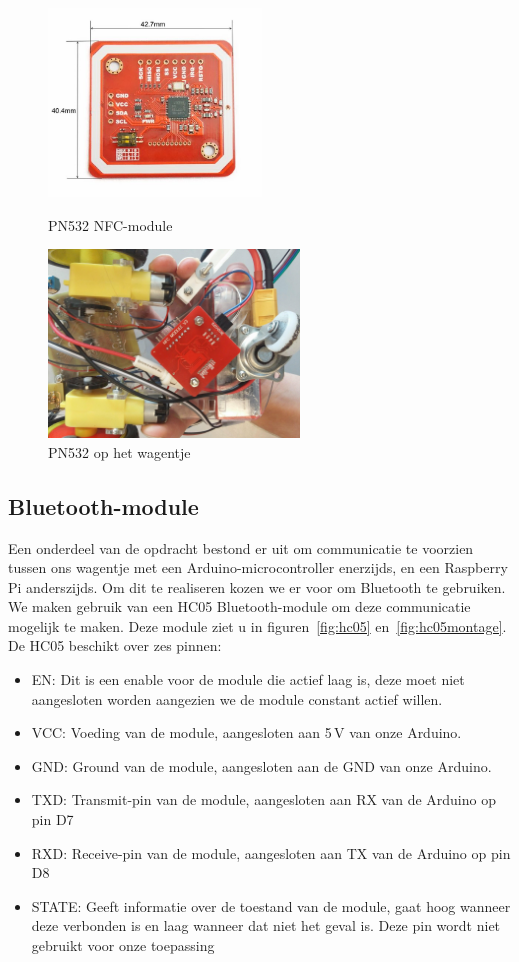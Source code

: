 \begin{figure}[H]
	\centering
	\begin{minipage}[b]{0.4\textwidth}
		\centering
		\includegraphics[height=5cm]{rfidlezer.png}
		\caption{PN532 NFC-module\label{fig:pn532}}
	\end{minipage}
	\hfill
	\begin{minipage}[b]{0.4\textwidth}
		\centering
		\includegraphics[height=5cm]{rfidlezermontage.png}
		\caption{PN532 op het wagentje\label{fig:rfidlezermontage}}
	\end{minipage}
\end{figure}
\subsection{Bluetooth-module}
Een onderdeel van de opdracht bestond er uit om communicatie te voorzien tussen ons wagentje met een Arduino-microcontroller enerzijds, en een Raspberry Pi anderszijds. Om dit te realiseren kozen we er voor om Bluetooth te gebruiken.
We maken gebruik van een HC05 Bluetooth-module om deze communicatie mogelijk te maken.
Deze module ziet u in figuren~\ref{fig:hc05} en~\ref{fig:hc05montage}. De HC05 beschikt over zes pinnen:
\begin{itemize}
	\item EN: Dit is een enable voor de module die actief laag is, deze moet niet aangesloten worden aangezien we de module constant actief willen.
	\item VCC: Voeding van de module, aangesloten aan 5\,V van onze Arduino.
	\item GND: Ground van de module, aangesloten aan de GND van onze Arduino.
	\item TXD: Transmit-pin van de module, aangesloten aan RX van de Arduino op pin D7
	\item RXD: Receive-pin van de module, aangesloten aan TX van de Arduino op pin D8
	\item STATE: Geeft informatie over de toestand van de module, gaat hoog wanneer deze verbonden is en laag wanneer dat niet het geval is. Deze pin wordt niet gebruikt voor onze toepassing
\end{itemize}

